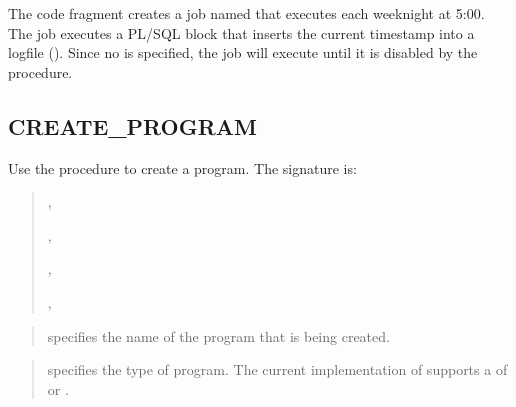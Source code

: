 \documentclass[letterpaper,10pt,english,openany,oneside]{sphinxmanual}
\begin{document}
The code fragment creates a job named  that executes each
weeknight at 5:00. The job executes a PL/SQL block that inserts the
current timestamp into a logfile (). Since no  is
specified, the job will execute until it is disabled by the
 procedure.

\newpage


\subsection{CREATE\_PROGRAM}
\label{\detokenize{create_program::doc}}\label{\detokenize{create_program:create-program}}
Use the  procedure to create a  program.
The signature is:
\begin{quote}

\begin{DUlineblock}{0em}
\item[] 
\item[] ,
\item[] 
\item[] ,
\item[] ,
\item[] ,
\item[] 
\end{DUlineblock}
\end{quote}


\begin{quote}

 specifies the name of the program that is being
created.
\end{quote}

\begin{quote}

 specifies the type of program. The current
implementation of  supports a  of
 or .
\end{quote}
\end{document}
